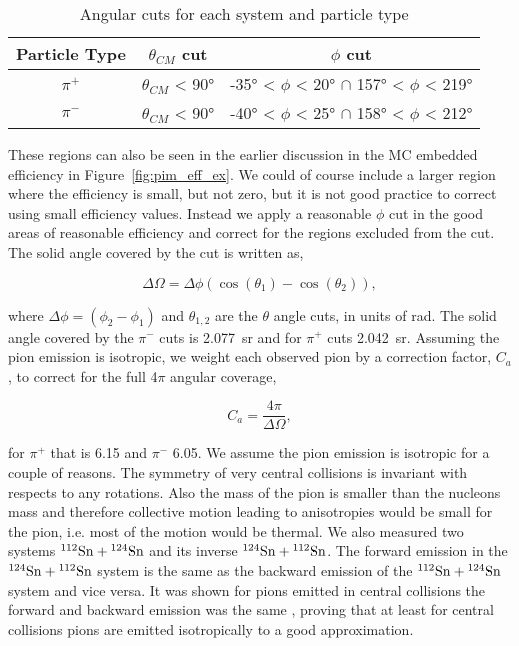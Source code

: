  \begin{table*}[!htb]
 \centering
{}
\begin{tabular}{@{}ccc@{}}\toprule 
Particle Type & $\theta_{CM}$ cut & $\phi$ cut  \\ [0.5ex] 
 \midrule
$\pi^+$  & $\theta_{CM}$ < \ang{90}   &  \ang{-35} < $\phi$ < \ang{20} $\cap$ \ang{157} < $\phi$ < \ang{219}  \\
$\pi^-$  & $\theta_{CM}$ < \ang{90}   &  \ang{-40} < $\phi$ < \ang{25} $\cap$ \ang{158} < $\phi$ < \ang{212}   \\
 \bottomrule
\end{tabular}
\caption{Angular cuts for each system and particle type}
\label{tb:anglecuts}
\end{table*}



These regions can also be seen in the earlier discussion in the MC embedded efficiency in Figure~\ref{fig:pim_eff_ex}.  We could of course include a larger region where the efficiency is small, but not zero, but it is not good practice to  correct using small efficiency values. Instead we apply a reasonable $\phi$ cut in the good areas of reasonable efficiency and correct for the regions excluded from the cut. The solid angle covered by the cut is written as,

\begin{equation}
\Delta\Omega = \Delta\phi(\cos(\theta_1) - \cos(\theta_2)),
\end{equation}

where $\Delta\phi = (\phi_2 - \phi_1)$  and $\theta_{1,2}$ are the $\theta$ angle cuts, in units of \si{\radian}. The solid angle covered by the $\pi^-$ cuts is \SI{2.077}{\steradian} and for $\pi^+$ cuts \SI{2.042}{\steradian}. Assuming the pion emission is isotropic, we weight each observed pion by a correction factor, $C_a$, to correct for the full 4$\pi$ angular coverage, 

\begin{equation}
C_a = \frac{4\pi}{\Delta\Omega},
\label{eq:acceptCorrFactor}
\end{equation}

for $\pi^+$ that is \num{6.15} and $\pi^-$ \num{6.05}. We assume the pion emission is isotropic for a couple of reasons. The symmetry of very central collisions is invariant with respects to any rotations. Also the mass of the pion is smaller than the nucleons mass and therefore collective motion leading to anisotropies would be small for the pion, i.e. most of the motion would be thermal. We also measured two systems ${}^{112}\mathrm{Sn} + {}^{124}\mathrm{Sn}$ and its inverse ${}^{124}\mathrm{Sn} + {}^{112}\mathrm{Sn}$. The forward emission in the ${}^{124}\mathrm{Sn} + {}^{112}\mathrm{Sn}$ system is the same as the backward emission of the ${}^{112}\mathrm{Sn} + {}^{124}\mathrm{Sn}$ system and vice versa. It was shown for pions emitted in central collisions the forward and backward emission was the same \cite{jon}, proving that at least for central collisions pions are emitted isotropically to a good approximation. 


